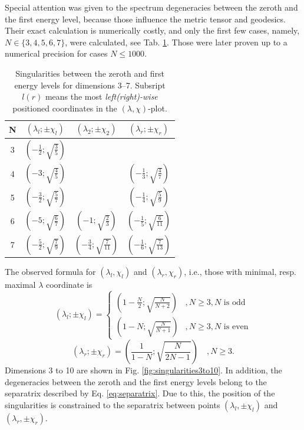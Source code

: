 Special attention was given to the spectrum degeneracies between the zeroth and the first energy level, because those influence the metric tensor and geodesics. Their exact calculation is numerically costly, and only the first few cases, namely, $N\in\{3,4,5,6,7\}$, were calculated, see Tab. \ref{tab:singularities}. Those were later proven up to a numerical precision for cases $N\leq1000$.  
\begin{table}[H]
    \centering
    \begin{tabular}{c||c|c|c}
     N&$(\lambda_l;\pm\chi_l)$&$(\lambda_2;\pm\chi_2)$&$(\lambda_r;\pm\chi_r)$        \\ \hline\hline
     3&$(-\frac{1}{2};\sqrt{\frac{3}{5}}) $&                                       &                                         \\
     4&$(-3          ;\sqrt{\frac{4}{5}}) $&                                       & $(-\frac{1}{3};\sqrt{\frac{4}{7}})$     \\
     5&$(-\frac{3}{2};\sqrt{\frac{5}{7}}) $&                                       & $(-\frac{1}{4};\sqrt{\frac{5}{9}})$     \\
     6&$(-5          ;\sqrt{\frac{6}{7}}) $&$(-1          ;\sqrt{\frac{2}{3}}) $   & $(-\frac{1}{5};\sqrt{\frac{6}{11}})$     \\
     7&$(-\frac{5}{2};\sqrt{\frac{7}{9}}) $&$(-\frac{3}{4};\sqrt{\frac{7}{11}}) $  & $(-\frac{1}{6};\sqrt{\frac{7}{13}})$ 
    \end{tabular}
    \caption{Singularities between the zeroth and first energy levels for dimensions 3--7. Subsript $l(r)$ means the most \emph{left(right)-wise} positioned coordinates in the $(\lambda,\chi)$-plot.}
    \label{tab:singularities}
    \end{table} 
The observed formula for $(\lambda_l,\chi_l)$ and $(\lambda_r,\chi_r)$, i.e., those with minimal, resp. maximal $\lambda$ coordinate is
\begin{equation}
    (\lambda_l ;\pm\chi_l)= \begin{cases}
        \left(1-\frac{N}{2};\sqrt{\frac{N}{N+2}}\right) & , N\geq 3,N\text{ is odd}\\
        \left(1-N;\sqrt{\frac{N}{N+1}}\right) & , N\geq 3,N\text{ is even}
    \end{cases}
    \label{eq:singularityCoordinateFormulaLeft}
\end{equation}
\begin{equation}
    (\lambda_r ;\pm\chi_r)= 
        \left(\frac{1}{1-N};\sqrt{\frac{N}{2N-1}}\right)\quad , N\geq 3.
        \label{eq:singularityCoordinateFormulaRight}
\end{equation}
Dimensions 3 to 10 are shown in Fig. \ref{fig:singularities3to10}.
In addition, the degeneracies between the zeroth and the first energy levels belong to the separatrix described by Eq. \ref{eq:separatrix}. Due to this, the position of the singularities is constrained to the separatrix between points $(\lambda_l,\pm\chi_l)$ and $(\lambda_r,\pm\chi_r)$.



